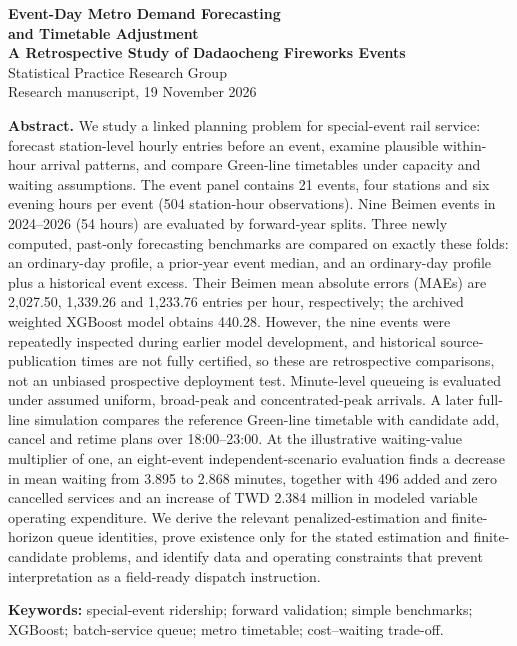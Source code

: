 \documentclass[a4paper,11pt]{article}
\numberwithin{equation}{section}
\begin{document}
\begin{center}
{\LARGE\sffamily\bfseries Event-Day Metro Demand Forecasting\\and Timetable Adjustment}\\[6pt]
{\large\sffamily\bfseries A Retrospective Study of Dadaocheng Fireworks Events}\\[8pt]
Statistical Practice Research Group\\
Research manuscript, 19 November 2026
\end{center}
\vspace{4pt}
\noindent\textbf{Abstract.}
We study a linked planning problem for special-event rail service: forecast station-level hourly entries before an event, examine plausible within-hour arrival patterns, and compare Green-line timetables under capacity and waiting assumptions. The event panel contains 21 events, four stations and six evening hours per event (504 station-hour observations). Nine Beimen events in 2024--2026 (54 hours) are evaluated by forward-year splits. Three newly computed, past-only forecasting benchmarks are compared on exactly these folds: an ordinary-day profile, a prior-year event median, and an ordinary-day profile plus a historical event excess. Their Beimen mean absolute errors (MAEs) are 2,027.50, 1,339.26 and 1,233.76 entries per hour, respectively; the archived weighted XGBoost model obtains 440.28. However, the nine events were repeatedly inspected during earlier model development, and historical source-publication times are not fully certified, so these are retrospective comparisons, not an unbiased prospective deployment test. Minute-level queueing is evaluated under assumed uniform, broad-peak and concentrated-peak arrivals. A later full-line simulation compares the reference Green-line timetable with candidate add, cancel and retime plans over 18:00--23:00. At the illustrative waiting-value multiplier of one, an eight-event independent-scenario evaluation finds a decrease in mean waiting from 3.895 to 2.868 minutes, together with 496 added and zero cancelled services and an increase of TWD 2.384 million in modeled variable operating expenditure. We derive the relevant penalized-estimation and finite-horizon queue identities, prove existence only for the stated estimation and finite-candidate problems, and identify data and operating constraints that prevent interpretation as a field-ready dispatch instruction.

\noindent\textbf{Keywords:} special-event ridership; forward validation; simple benchmarks; XGBoost; batch-service queue; metro timetable; cost--waiting trade-off.
\vspace{7pt}
\tableofcontents
\clearpage
{}





\end{document}
